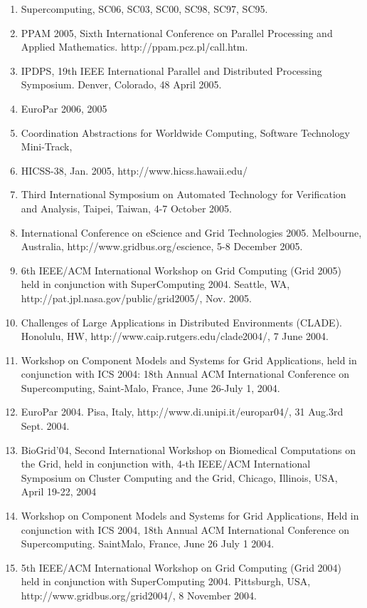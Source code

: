 \documentclass{article}
\begin{document}
\begin{enumerate}
\item  Supercomputing, SC06, SC03, SC00, SC98, SC97, SC95.
\item  PPAM 2005, Sixth International Conference on Parallel Processing and Applied Mathematics. http://ppam.pcz.pl/call.htm. 
\item  IPDPS, 19th IEEE International Parallel and Distributed Processing Symposium. Denver, Colorado, 48 April 2005. 
\item  EuroPar 2006, 2005 
\item  Coordination Abstractions for Worldwide Computing, Software Technology Mini-Track, 
\item  HICSS-38, Jan. 2005, http://www.hicss.hawaii.edu/ 
\item  Third International Symposium on Automated Technology for Verification and Analysis, Taipei, Taiwan, 4-7 October 2005. 
\item  International Conference on eScience and Grid Technologies 2005. Melbourne, Australia, http://www.gridbus.org/escience, 5-8 December 2005. 
\item  6th IEEE/ACM International Workshop on Grid Computing (Grid 2005) held in conjunction with SuperComputing 2004. Seattle, WA, http://pat.jpl.nasa.gov/public/grid2005/, Nov. 2005. 
\item  Challenges of Large Applications in Distributed Environments (CLADE). Honolulu, HW, http://www.caip.rutgers.edu/clade2004/, 7 June 2004. 
\item  Workshop on Component Models and Systems for Grid Applications, held in conjunction with ICS 2004: 18th Annual ACM International Conference on Supercomputing, Saint-Malo, France, June 26-July 1, 2004. 
\item  EuroPar 2004. Pisa, Italy, http://www.di.unipi.it/europar04/, 31 Aug.3rd Sept. 2004. 
\item  BioGrid'04, Second International Workshop on Biomedical Computations on the Grid, held in conjunction with, 4-th IEEE/ACM International Symposium on Cluster Computing and the Grid, Chicago, Illinois, USA, April 19-22, 2004 
\item  Workshop on Component Models and Systems for Grid Applications, Held in conjunction with ICS 2004, 18th Annual ACM International Conference on Supercomputing. SaintMalo, France, June 26 July 1 2004. 
\item  5th IEEE/ACM International Workshop on Grid Computing (Grid 2004) held in conjunction with SuperComputing 2004. Pittsburgh, USA, http://www.gridbus.org/grid2004/, 8 November 2004. 

\end{enumerate}
\end{document}
